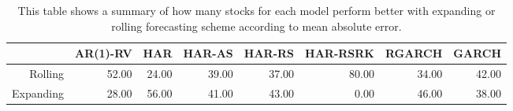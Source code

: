 \begin{table}[ht]
\centering
\begin{tabular}{rrrrrrrr}
  \hline
 & AR(1)-RV & HAR & HAR-AS & HAR-RS & HAR-RSRK & RGARCH & GARCH \\ 
  \hline
Rolling & 52.00 & 24.00 & 39.00 & 37.00 & 80.00 & 34.00 & 42.00 \\ 
  Expanding & 28.00 & 56.00 & 41.00 & 43.00 & 0.00 & 46.00 & 38.00 \\ 
   \hline
\end{tabular}
\caption[Better scheme MAE summary]{This table shows a summary of how many stocks for each model perform better with expanding or rolling forecasting scheme according to mean absolute error. } 
\label{Table:Better_MAE_summary}
\end{table}
